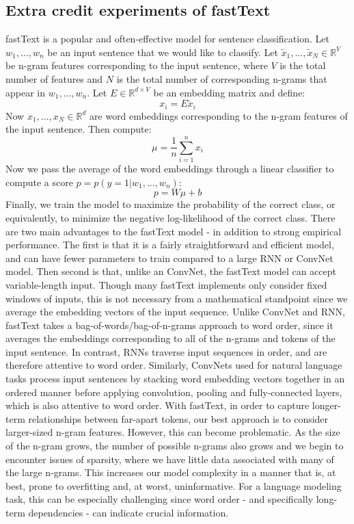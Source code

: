 \documentclass[a4paper]{article}
\begin{document}
\subsection{Extra credit experiments of fastText}
fastText is a popular and often-effective model for sentence classification. Let $w_1,...,w_n$ be an input sentence that we would like to classify. Let $\tilde{x}_1,...,\tilde{x}_N \in \mathbb{R}^V$ be n-gram features corresponding to the input sentence, where $V$ is the total number of features and $N$ is the total number of corresponding n-grams that appear in $w_1,...,w_n$. Let $E \in \mathbb{R}^{d \times V}$ be an embedding matrix and define:
$$x_i = E \tilde{x}_i $$
Now $x_1,...,x_N \in \mathbb{R}^{d}$ are word embeddings corresponding to the n-gram features of the input sentence. Then compute:
$$\mu = \frac{1}{n} \sum_{i=1}^n x_i $$
Now we pass the average of the word embeddings through a linear classifier to compute a score $p = p(y=1 | w_1,...,w_n)$:
$$ p = W \mu + b $$
Finally, we train the model to maximize the probability of the correct class, or equivalently, to minimize the negative log-likelihood of the correct class. 
\newline
\newline
There are two main advantages to the fastText model - in addition to strong empirical performance. The first is that it is a fairly straightforward and efficient model, and can have fewer parameters to train compared to a large RNN or ConvNet model. Then second is that, unlike an ConvNet, the fastText model can accept variable-length input. Though many fastText implements only consider fixed windows of inputs, this is not necessary from a mathematical standpoint since we average the embedding vectors of the input sequence.
\newline
\newline
Unlike ConvNet and RNN, fastText takes a bag-of-words/bag-of-n-grams approach to word order, since it averages the embeddings corresponding to all of the n-grams and tokens of the input sentence. In contrast, RNNs traverse input sequences in order, and are therefore attentive to word order. Similarly, ConvNets used for natural language tasks process input sentences by stacking word embedding vectors together in an ordered manner before applying convolution, pooling and fully-connected layers, which is also attentive to word order. With fastText, in order to capture longer-term relationships between far-apart tokens, our best approach is to consider larger-sized n-gram features. However, this can become problematic. As the size of the n-gram grows, the number of possible n-grams also grows and we begin to encounter issues of sparsity, where we have little data associated with many of the large n-grams. This increases our model complexity in a manner that is, at best, prone to overfitting and, at worst, uninformative. For a language modeling task, this can be especially challenging since word order - and specifically long-term dependencies - can indicate crucial information. 
\end{document}
